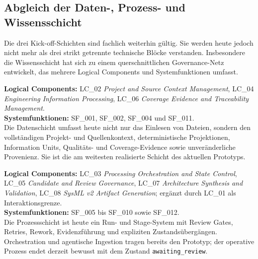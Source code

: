 \subsection{Abgleich der Daten-, Prozess- und Wissensschicht}

Die drei Kick-off-Schichten sind fachlich weiterhin gültig. Sie werden heute jedoch nicht mehr als drei strikt getrennte technische Blöcke verstanden. Insbesondere die Wissensschicht hat sich zu einem querschnittlichen Governance-Netz entwickelt, das mehrere Logical Components und Systemfunktionen umfasst.

\begin{tcolorbox}[
  enhanced,
  breakable,
  colback=TuringData!5,
  colframe=TuringData,
  title={Datenschicht: erhalten und operationalisiert},
  fonttitle=\bfseries,
  arc=2mm
]
\textbf{Logical Components:} LC\_02 \emph{Project and Source Context Management}, LC\_04 \emph{Engineering Information Processing}, LC\_06 \emph{Coverage Evidence and Traceability Management}.\\[1mm]
\textbf{Systemfunktionen:} SF\_001, SF\_002, SF\_004 und SF\_011.\\[1mm]
Die Datenschicht umfasst heute nicht nur das Einlesen von Dateien, sondern den vollständigen Projekt- und Quellenkontext, deterministische Projektionen, Information Units, Qualitäts- und Coverage-Evidence sowie unveränderliche Provenienz. Sie ist die am weitesten realisierte Schicht des aktuellen Prototyps.
\end{tcolorbox}

\begin{tcolorbox}[
  enhanced,
  breakable,
  colback=TuringProcess!5,
  colframe=TuringProcess,
  title={Prozessschicht: von linear zu vernetzt weiterentwickelt},
  fonttitle=\bfseries,
  arc=2mm
]
\textbf{Logical Components:} LC\_03 \emph{Processing Orchestration and State Control}, LC\_05 \emph{Candidate and Review Governance}, LC\_07 \emph{Architecture Synthesis and Validation}, LC\_08 \emph{SysML v2 Artifact Generation}; ergänzt durch LC\_01 als Interaktionsgrenze.\\[1mm]
\textbf{Systemfunktionen:} SF\_005 bis SF\_010 sowie SF\_012.\\[1mm]
Die Prozessschicht ist heute ein Run- und Stage-System mit Review Gates, Retries, Rework, Evidenzführung und expliziten Zustandsübergängen. Orchestration und agentische Ingestion tragen bereits den Prototyp; der operative Prozess endet derzeit bewusst mit dem Zustand \texttt{awaiting\_review}.
\end{tcolorbox}

